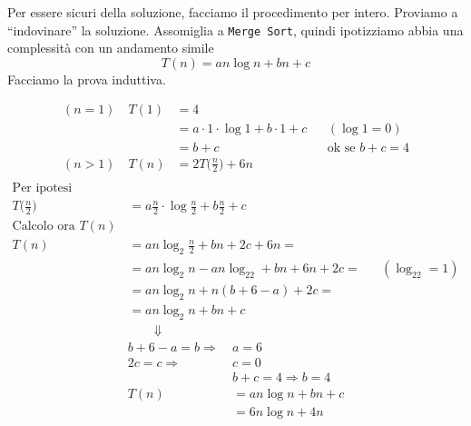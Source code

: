 Per essere sicuri della soluzione, facciamo il procedimento per intero.
Proviamo a ``indovinare'' la soluzione. Assomiglia a \texttt{Merge Sort},
quindi ipotizziamo abbia una complessità con un andamento simile 
\begin{displaymath}
	T(n) = an \log n + bn + c
\end{displaymath}
Facciamo la prova induttiva.

\begin{align*}
	(n = 1) \quad T(1) & = 4 \\
	& = a \cdot 1 \cdot \log 1 + b \cdot 1 + c  && (\log 1 = 0)\\
	& = b + c && \text{ok se } b + c = 4 \\
	(n > 1) \quad T(n) & = 2T \big( \frac{n}{2} \big) + 6n \\
\end{align*}
\begin{align*}
	\text{Per ipotesi induttiva} \\
	T \big( \frac{n}{2} \big) & = a \frac{n}{2} \cdot \log \frac{n}{2} + b \frac{n}{2} + c \\
	\text{Calcolo ora } T(n) \\
	T(n) & = an \log_2 \frac{n}{2} + bn + 2c + 6n = \\
	& = an \log_2n - an \log_22 + bn + 6n + 2c =  && (\log_22 = 1)\\
	& = an \log_2n + n(b + 6 - a) + 2c = \\
	& = an \log_2n + bn + c \\
	& \qquad \Downarrow
\end{align*}
\begin{align*}
	b + 6 - a = b \Rightarrow \ & a = 6 \\
	2c = c \Rightarrow \ & c = 0 \\
	& b + c = 4 \Rightarrow b = 4 \\
	T(n) &= an \log n + bn + c \\
	&= 6n \log n + 4n
\end{align*}